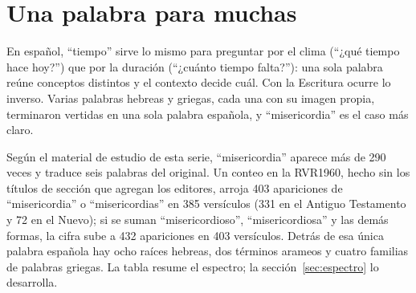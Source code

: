 
\section{Una palabra para muchas}

En español, ``tiempo'' sirve lo mismo para preguntar por el clima (``¿qué tiempo hace hoy?'') que por la duración (``¿cuánto tiempo falta?''): una sola palabra reúne conceptos distintos y el contexto decide cuál. Con la Escritura ocurre lo inverso. Varias palabras hebreas y griegas, cada una con su imagen propia, terminaron vertidas en una sola palabra española, y ``misericordia'' es el caso más claro.

Según el material de estudio de esta serie, ``misericordia'' aparece más de 290 veces y traduce seis palabras del original. Un conteo en la RVR1960, hecho sin los títulos de sección que agregan los editores, arroja 403 apariciones de ``misericordia'' o ``misericordias'' en 385 versículos (331 en el Antiguo Testamento y 72 en el Nuevo); si se suman ``misericordioso'', ``misericordiosa'' y las demás formas, la cifra sube a 432 apariciones en 403 versículos. Detrás de esa única palabra española hay ocho raíces hebreas, dos términos arameos y cuatro familias de palabras griegas. La tabla resume el espectro; la sección~\ref{sec:espectro} lo desarrolla.

